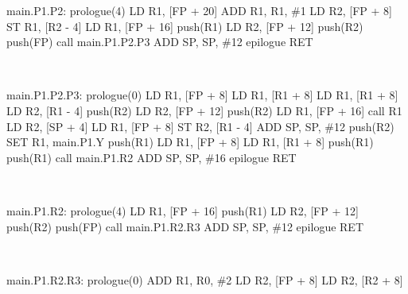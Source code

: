 \documentclass[12pt,fleqn]{article}		%
\begin{document}
\begin{enumerate}
\begin{algorithmic}
\State main.P1.P2:
\State prologue(4)
\State {}
\State LD R1, [FP + 20]
\State ADD R1, R1, \#1
\State LD R2, [FP + 8]
\State ST R1, [R2 - 4]
\State {}
\State LD R1, [FP + 16]
\State push(R1) 
\State LD R2, [FP + 12]
\State push(R2) 
\State push(FP) 
\State call main.P1.P2.P3
\State ADD SP, SP, \#12 
\State epilogue
\State RET
\end{algorithmic}
\ \\
\begin{algorithmic}
\State main.P1.P2.P3:
\State prologue(0)
\State {}
\State LD R1, [FP + 8]
\State LD R1, [R1 + 8]
\State LD R1, [R1 + 8]
\State LD R2, [R1 - 4]
\State push(R2) 
\State LD R2, [FP + 12]
\State push(R2) 
\State LD R1, [FP + 16]
\State call R1
\State LD R2, [SP + 4] 
\State LD R1, [FP + 8]
\State ST R2, [R1 - 4]
\State ADD SP, SP, \#12 
\State {}
\State push(R2) 
\State SET R1, main.P1.Y
\State push(R1) 
\State LD R1, [FP + 8]
\State LD R1, [R1 + 8]
\State push(R1) 
\State push(R1) 
\State call main.P1.R2
\State ADD SP, SP, \#16 
\State epilogue
\State RET
\end{algorithmic}
\ \\
\begin{algorithmic}
\State main.P1.R2:
\State prologue(4)
\State {}
\State LD R1, [FP + 16]
\State push(R1) 
\State LD R2, [FP + 12]
\State push(R2) 
\State push(FP) 
\State call main.P1.R2.R3
\State ADD SP, SP, \#12 
\State epilogue
\State RET
\end{algorithmic}
\ \\
\begin{algorithmic}
\State main.P1.R2.R3:
\State prologue(0)
\State {}
\State ADD R1, R0, \#2
\State LD R2, [FP + 8]
\State LD R2, [R2 + 8]

\end{algorithmic}
\end{enumerate}
\end{document}
